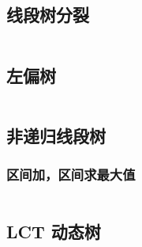 \documentclass[titlepage, a4paper]{article}
\begin{document}
\begin{multicols}{2}
\begin{spacing}{0.6}
				\subsection{线段树分裂}
					\inputminted{cpp}{src/DataStructure/线段树分裂.cpp}
				\subsection{左偏树}
					\inputminted{cpp}{src/DataStructure/左偏树.cpp}
				\subsection{非递归线段树}
					\subsubsection{区间加，区间求最大值}
						\inputminted{cpp}{src/DataStructure/非递归线段树求最大值.cpp}
				\subsection{LCT 动态树}
					\inputminted{cpp}{src/DataStructure/LCT.cpp}
			

\end{spacing}
\end{multicols}
\end{document}
